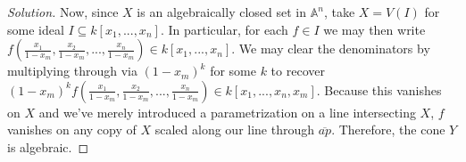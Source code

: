 \documentclass[10pt]{article}
\begin{document}
\begin{proof}[Solution]
Now, since $X$ is an algebraically closed set in $\mathbb{A}^n$, take $X = V(I)$ for some ideal $I \subseteq k[x_1,...,x_n]$. In particular, for each $f \in I$ we may then write $f(\frac{x_1}{1 - x_m},\frac{x_2}{1 - x_m},...,\frac{x_n}{1 - x_m}) \in  k[x_1,...,x_n]$. We may clear the denominators by multiplying through via $(1-x_m)^k$ for some $k$ to recover $(1-x_m)^kf(\frac{x_1}{1 - x_m},\frac{x_2}{1 - x_m},...,\frac{x_n}{1 - x_m}) \in k[x_1,...,x_n,x_m]$. Because this vanishes on $X$ and we've merely introduced a parametrization on a line intersecting $X$, $f$ vanishes on any copy of $X$ scaled along our line through $\overline{ap}$. Therefore, the cone $Y$ is algebraic.



\end{proof}
\end{document}
